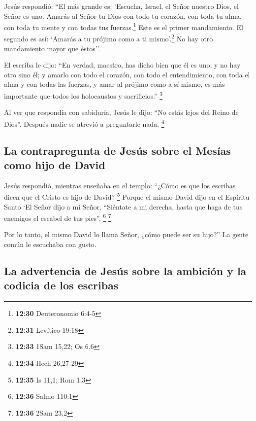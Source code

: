  Jesús respondió: ``El más grande es: `Escucha, Israel,
el Señor nuestro Dios, el Señor es uno.  Amarás al Señor
tu Dios con todo tu corazón, con toda tu alma, con toda tu mente y con
todas tus fuerzas.\footnote{\textbf{12:30} Deuteronomio 6:4-5} Este es
el primer mandamiento.  El segundo es así: `Amarás a tu
prójimo como a ti mismo'.\footnote{\textbf{12:31} Levítico 19:18} No hay
otro mandamiento mayor que éstos''.

 El escriba le dijo: ``En verdad, maestro, has dicho bien
que él es uno, y no hay otro sino él;  y amarlo con todo
el corazón, con todo el entendimiento, con toda el alma y con todas las
fuerzas, y amar al prójimo como a sí mismo, es más importante que todos
los holocaustos y sacrificios.'' \footnote{\textbf{12:33} 1Sam 15,22; Os
  6,6}

 Al ver que respondía con sabiduría, Jesús le dijo: ``No
estás lejos del Reino de Dios''. Después nadie se atrevió a preguntarle
nada. \footnote{\textbf{12:34} Hech 26,27-29}

\hypertarget{la-contrapregunta-de-jesuxfas-sobre-el-mesuxedas-como-hijo-de-david}{%
\subsection{La contrapregunta de Jesús sobre el Mesías como hijo de
David}\label{la-contrapregunta-de-jesuxfas-sobre-el-mesuxedas-como-hijo-de-david}}

 Jesús respondió, mientras enseñaba en el templo: ``¿Cómo
es que los escribas dicen que el Cristo es hijo de David? \footnote{\textbf{12:35}
  Is 11,1; Rom 1,3}  Porque el mismo David dijo en el
Espíritu Santo `El Señor dijo a mi Señor, ``Siéntate a mi derecha, hasta
que haga de tus enemigos el escabel de tus pies''. \footnote{\textbf{12:36}
  Salmo 110:1} \footnote{\textbf{12:36} 2Sam 23,2}

 Por lo tanto, el mismo David lo llama Señor, ¿cómo puede
ser su hijo?'' La gente común le escuchaba con gusto.

\hypertarget{la-advertencia-de-jesuxfas-sobre-la-ambiciuxf3n-y-la-codicia-de-los-escribas}{%
\subsection{La advertencia de Jesús sobre la ambición y la codicia de
los
escribas}\label{la-advertencia-de-jesuxfas-sobre-la-ambiciuxf3n-y-la-codicia-de-los-escribas}}

